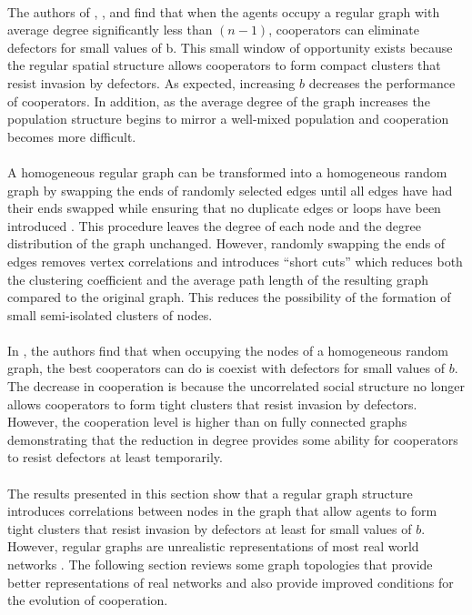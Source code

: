 \documentclass{article}
\begin{document}
    \paragraph{}The authors of \cite{Pacheco2005}, \cite{Santos2006a}, \cite{Santos2006c} and \cite{Santos2005b} find that when the agents occupy a regular graph with average degree significantly less than $(n-1)$, cooperators can eliminate defectors for small values of b.  This small window of opportunity exists because the regular spatial structure allows cooperators to form compact clusters that resist invasion by defectors.  As expected, increasing $b$ decreases the performance of cooperators.  In addition, as the average degree of the graph increases the population structure begins to mirror a well-mixed population and cooperation becomes more difficult.
    \paragraph{}A homogeneous regular graph can be transformed into a homogeneous random graph by swapping the ends of randomly selected edges until all edges have had their ends swapped while ensuring that no duplicate edges or loops have been introduced \cite{Maslov2002}.  This procedure leaves the degree of each node and the degree distribution of the graph unchanged. However, randomly swapping the ends of edges removes vertex correlations and introduces “short cuts” which reduces both the clustering coefficient and the average path length of the resulting graph compared to the original graph.  This reduces the possibility of the formation of small semi-isolated clusters of nodes.
    \paragraph{}In \cite{Santos2006c}, the authors find that when occupying the nodes of a homogeneous random graph, the best cooperators can do is coexist with defectors for small values of $b$.  The decrease in cooperation is because the uncorrelated social structure no longer allows cooperators to form tight clusters that resist invasion by defectors.  However, the cooperation level is higher than on fully connected graphs demonstrating that the reduction in degree provides some ability for cooperators to resist defectors at least temporarily.
    \paragraph{} The results presented in this section show that a regular graph structure introduces correlations between nodes in the graph that allow agents to form tight clusters that resist invasion by defectors at least for small values of $b$.  However, regular graphs are unrealistic representations of most real world networks \cite{Pacheco2005}.  The following section reviews some graph topologies that provide better representations of real networks and also provide improved conditions for the evolution of cooperation.
\end{document}
